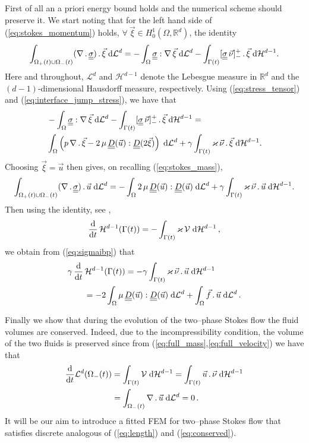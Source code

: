 \documentclass[a4paper,12pt,onecolumn]{article}
\newcommand{\R}{{\mathbb R}}
\newcommand{\vol}{\mathcal{L}^d}
\newcommand{\dH}[1]{\;{\rm d}{\cal H}^{#1}} %
\newcommand{\dL}[1]{\;{\rm d}{\cal L}^{#1}} %
\newcommand{\ddt}{\frac{\rm d}{{\rm d}t}}
\newcommand{\mat}[1]{\underline{\underline{#1}}\rule{0pt}{0pt}}
\begin{document}
First of all an a priori energy bound holds and the numerical scheme should
preserve it. We start noting that for the left hand side of
(\ref{eq:stokes_momentum}) holds, $\forall \ \vec \xi \in H^1_0(\Omega, \R^d)$,
the identity
\begin{equation}\label{eq:weak_stress_tensor}
\int_{\Omega_+(t)\cup\Omega_-(t)} (\nabla\,.\,\mat\sigma)\,.\, \vec \xi \dL{d}
= - \int_{\Omega} \mat\sigma : \nabla\,\vec \xi \dL{d}
- \int_{\Gamma(t)} [\mat\sigma\,\vec\nu]_-^+\, . \,\vec \xi  \dH{d-1}.
\end{equation}
Here and throughout, $\mathcal{L}^d$ and $\mathcal{H}^{d-1}$ denote the
Lebesgue measure in $\R^d$ and the $(d-1)$-dimensional Hausdorff measure,
respectively. Using (\ref{eq:stress_tensor}) and
(\ref{eq:interface_jump_stress}), we have that
\begin{align}
& - \int_{\Omega} \mat\sigma : \nabla\,\vec \xi \dL{d} - \int_{\Gamma(t)}
[\mat\sigma\,\vec\nu]_-^+\, . \,\vec \xi  \dH{d-1} = \nonumber\\
&\int_{\Omega}
\left( p\,\nabla\,.\,\vec \xi -2\,\mu\,\mat D(\vec u) : \mat D(2\vec \xi)
\right) \dL{d} + \gamma \int_{\Gamma(t)} \varkappa\,\vec \nu \,.\, \vec \xi
\dH{d-1}.
\end{align}
Choosing $\vec \xi=\vec u$ then gives, on recalling (\ref{eq:stokes_mass}),
\begin{equation}\label{eq:sigmaibp}
\int_{\Omega_+(t)\cup\Omega_-(t)} (\nabla\,.\,\mat\sigma)\,.\, \vec u \dL{d} =
-\int_{\Omega} 2\,\mu\,\mat D(\vec u) : \mat D(\vec u) \dL{d} + \gamma
\int_{\Gamma(t)} \varkappa\,\vec \nu \,.\, \vec u \dH{d-1}.
\end{equation}
Then using the identity, see \cite[Lemma~2.1]{DeckelnickDE05},
\begin{equation}\label{eq:dtarea}
\ddt\,\mathcal{H}^{d-1}(\Gamma(t)) = -\int_{\Gamma(t)} \varkappa\,\mathcal{V}
\dH{d-1} \,,
\end{equation}
we obtain from (\ref{eq:sigmaibp}) that
\begin{align}
& \gamma\,\ddt\,\mathcal{H}^{d-1}(\Gamma(t)) = -\gamma \int_{\Gamma(t)}
\varkappa\,\vec \nu \,.\,\vec u \dH{d-1} \nonumber\\
& \qquad =-2\int_\Omega\mu\, \mat D(\vec u):\mat D(\vec u) \dL{d} +\int_\Omega
\vec f\,.\, \vec u \dL{d}\,.\label{eq:length}
\end{align}

Finally we show that during the evolution of the two--phase Stokes flow the
fluid volumes are conserved. Indeed, due to the incompressibility condition, the
volume of the two fluids is preserved since from
(\ref{eq:full_mass},\ref{eq:full_velocity}) we have that
\begin{align}
\ddt \vol(\Omega_-(t)) & = \int_{\Gamma(t)}
\mathcal{V}\dH{d-1}=\int_{\Gamma(t)}\vec u\,.\,\vec\nu \dH{d-1} \nonumber \\
& = \int_{\Omega_-(t)} \nabla\,.\,\vec u \dL{d} =0\,. \label{eq:conserved}
\end{align}
It will be our aim to introduce a fitted FEM for two--phase Stokes flow that
satisfies discrete analogous of (\ref{eq:length}) and (\ref{eq:conserved}).
\end{document}
